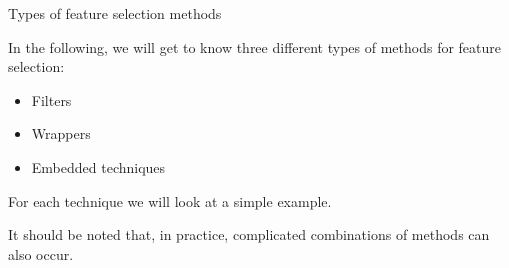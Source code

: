 \begin{vbframe}{Types of feature selection methods}

In the following, we will get to know three different types of methods for feature selection:

\lz

\begin{itemize}
  \item Filters
  \item Wrappers
  \item Embedded techniques
\end{itemize}

\lz

For each technique we will look at a simple example.

\lz

It should be noted that, in practice, complicated combinations of methods can also occur.

\end{vbframe}

\endlecture
